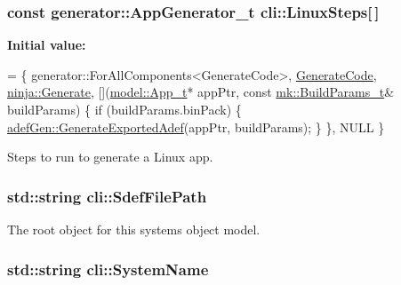 \subsubsection[{\texorpdfstring{Linux\+Steps}{LinuxSteps}}]{\setlength{\rightskip}{0pt plus 5cm}const {\bf generator\+::\+App\+Generator\+\_\+t} cli\+::\+Linux\+Steps\mbox{[}$\,$\mbox{]}\hspace{0.3cm}{\ttfamily [static]}}\hypertarget{namespacecli_ac748ac806e1653b10b7d69d03de49c0a}{}\label{namespacecli_ac748ac806e1653b10b7d69d03de49c0a}
{\bfseries Initial value\+:}
\begin{DoxyCode}
=
\{
    generator::ForAllComponents<GenerateCode>,
    \hyperlink{namespacecli_a10febdedb75bc753ace72299f10c495b}{GenerateCode},
    \hyperlink{namespaceninja_a09e306ee7633de552e4384a80ede442f}{ninja::Generate},
    [](\hyperlink{structmodel_1_1_app__t}{model::App\_t}* appPtr, \textcolor{keyword}{const} \hyperlink{structmk_1_1_build_params__t}{mk::BuildParams\_t}& buildParams)
    \{
        \textcolor{keywordflow}{if} (buildParams.binPack)
        \{
            \hyperlink{namespaceadef_gen_a7ad60e4fbb58b3029d21df1094621ad4}{adefGen::GenerateExportedAdef}(appPtr, buildParams);
        \}
    \},
    NULL
\}
\end{DoxyCode}


Steps to run to generate a Linux app. 

\subsubsection[{\texorpdfstring{Sdef\+File\+Path}{SdefFilePath}}]{\setlength{\rightskip}{0pt plus 5cm}std\+::string cli\+::\+Sdef\+File\+Path\hspace{0.3cm}{\ttfamily [static]}}\hypertarget{namespacecli_ad6e30d8816be2c99041d3dbcc8bf74a4}{}\label{namespacecli_ad6e30d8816be2c99041d3dbcc8bf74a4}


The root object for this system\textquotesingle{}s object model. 

\subsubsection[{\texorpdfstring{System\+Name}{SystemName}}]{\setlength{\rightskip}{0pt plus 5cm}std\+::string cli\+::\+System\+Name\hspace{0.3cm}{\ttfamily [static]}}\hypertarget{namespacecli_a577c9d35d55850a04415169a6b5e8586}{}\label{namespacecli_a577c9d35d55850a04415169a6b5e8586}


